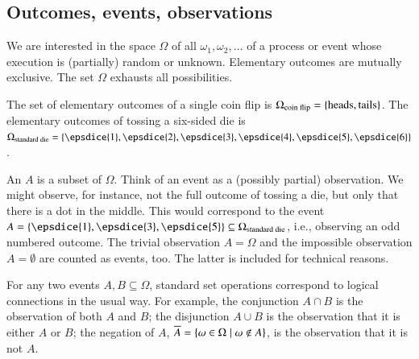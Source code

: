 \documentclass[nobib,nofonts]{tufte-handout}
\begin{document}
\subsection{Outcomes, events, observations}

We are interested in the space $\Omega$ of all  $\omega_1,
\omega_2, \dots$ of a process or event whose execution is (partially) random or
unknown. Elementary outcomes are mutually exclusive. The set $\Omega$ exhausts all
possibilities.

\begin{example}
  The set of elementary outcomes of a single coin flip is $\Omega_{\text{coin flip}} =
  \left\{\text{heads}, \text{tails}\right\}$. The elementary outcomes of tossing a six-sided die is
  $\Omega_{\text{standard die}} = \set{\epsdice{1}, \epsdice{2}, \epsdice{3}, \epsdice{4},
    \epsdice{5}, \epsdice{6}}$.
\end{example}

An  $A$ is a subset of $\Omega$. Think of an event as a (possibly partial)
observation. We might observe, for instance, not the full outcome of tossing a die, but only
that there is a dot in the middle. This would correspond to the event
$A = \set{\epsdice{1}, \epsdice{3}, \epsdice{5}} \subseteq \Omega_{\text{standard die}}$,
i.e., observing an odd numbered outcome. The trivial observation $A = \Omega$ and the
impossible observation $A = \emptyset$ are counted as events, too. The latter is included for
technical reasons.


For any two events $A, B \subseteq \Omega$, standard set operations correspond to logical
connections in the usual way. For example, the conjunction $A \cap B$ is the observation of
both $A$ and $B$; the disjunction $A \cup B$ is the observation that it is either $A$ or $B$;
the negation of $A$, $\overline{A} = \left\{\omega \in \Omega \mid \omega \not \in A\right\}$, is the
observation that it is not $A$.
\end{document}
